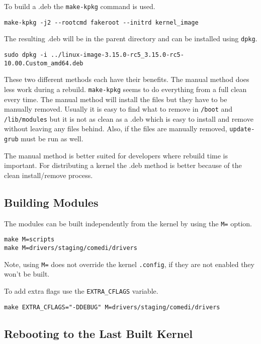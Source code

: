 \documentclass{article}
\begin{document}
To build a .deb the \verb+make-kpkg+ command is used.

\begin{verbatim}
make-kpkg -j2 --rootcmd fakeroot --initrd kernel_image
\end{verbatim}

The resulting .deb will be in the parent directory and can be installed
using \verb+dpkg+.

\begin{verbatim}
sudo dpkg -i ../linux-image-3.15.0-rc5_3.15.0-rc5-10.00.Custom_amd64.deb
\end{verbatim}

These two different methods each have their benefits.  The manual method
does less work during a rebuild.  \verb+make-kpkg+ seems to do everything
from a full clean every time.  The manual method will install the files
but they have to be manually removed.  Usually it is easy to find what
to remove in \verb+/boot+ and \verb+/lib/modules+ but it is not as clean as a .deb
which is easy to install and remove without leaving any files behind.
Also, if the files are manually removed, \verb+update-grub+ must be run as
well.

The manual method is better suited for developers where rebuild time is
important.  For distributing a kernel the .deb method is better because
of the clean install/remove process.

\subsection{Building Modules}

The modules can be built independently from the kernel by using the \verb+M=+
option.

\begin{verbatim}
make M=scripts
make M=drivers/staging/comedi/drivers
\end{verbatim}

Note, using \verb+M=+ does not override the kernel \verb+.config+, if they are not
enabled they won't be built.

To add extra flags use the \verb+EXTRA_CFLAGS+ variable.

\begin{verbatim}
make EXTRA_CFLAGS="-DDEBUG" M=drivers/staging/comedi/drivers
\end{verbatim}

\subsection{Rebooting to the Last Built Kernel}
\end{document}

